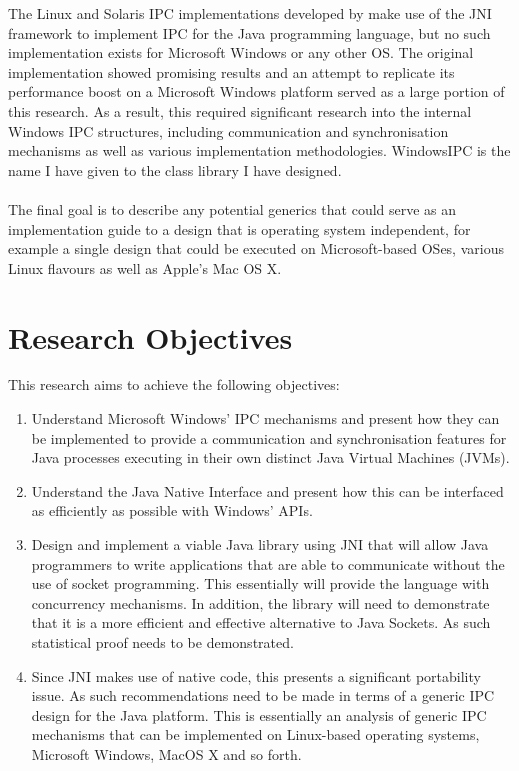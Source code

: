 \documentclass[12pt] {newrucsthesis}    %
\begin{document}
      The Linux and Solaris IPC implementations developed by \cite{WellsIPCJava} make use of the JNI framework
      to implement IPC for the Java programming language, but no such implementation exists for Microsoft Windows
      or any other OS. The original implementation showed promising results and an attempt to
      replicate its performance boost on a Microsoft Windows platform served as a large
      portion of this research. As a result, this required significant research into
      the internal Windows IPC structures, including communication and synchronisation mechanisms as well as various
      implementation methodologies. WindowsIPC is the name I have given to the class library I have designed.
      \\\\
      The final goal is to describe any potential generics that could serve as an implementation guide
      to a design that is operating system independent, for example a single design that could be executed
      on Microsoft-based OSes, various Linux flavours as well as Apple's Mac OS X.


    \section{Research Objectives} \label{researchobjectives}
      This research aims to achieve the following objectives:
      \begin{enumerate}
        \item Understand Microsoft Windows' IPC mechanisms and present how they can be implemented to provide a communication
              and synchronisation features for Java processes executing in their own distinct Java Virtual Machines (JVMs).

        \item Understand the Java Native Interface and present how this can be interfaced as efficiently as possible with
              Windows' APIs.

        \item Design and implement a viable Java library using JNI that will allow Java programmers to write applications that are able to
              communicate without the use of socket programming. This essentially will provide the
              language with concurrency mechanisms. In addition, the library will need to demonstrate that
              it is a more efficient and effective alternative to Java Sockets. As such statistical proof needs to be
              demonstrated.

        \item Since JNI makes use of native code, this presents a significant portability issue. As such recommendations
              need to be made in terms of a generic IPC design for the Java platform. This is essentially an analysis of
              generic IPC mechanisms that can be implemented on Linux-based operating systems, Microsoft Windows, MacOS X
              and so forth.
      \end{enumerate}
\end{document}
